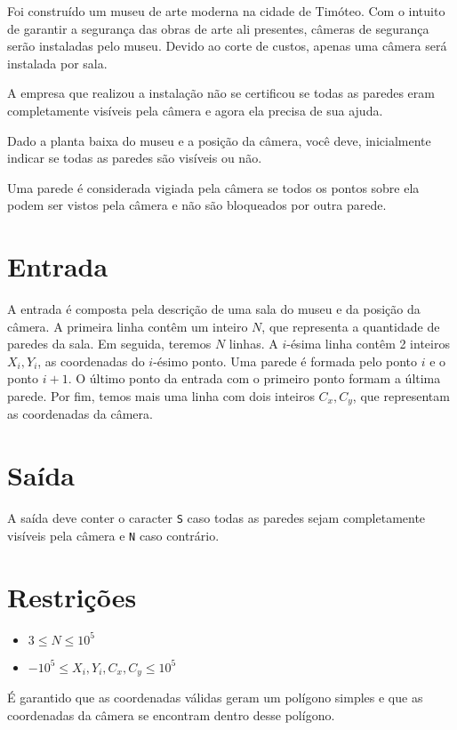 Foi construído um museu de arte moderna na cidade de Timóteo.
Com o intuito de garantir a segurança das obras de arte ali presentes, câmeras de segurança serão instaladas pelo museu.
Devido ao corte de custos, apenas uma câmera será instalada por sala.

A empresa que realizou a instalação não se certificou se todas as paredes eram completamente visíveis pela câmera e agora ela precisa de sua ajuda.

Dado a planta baixa do museu e a posição da câmera, você deve, inicialmente indicar se todas as paredes são visíveis ou não.

Uma parede é considerada vigiada pela câmera se todos os pontos sobre ela podem ser vistos pela câmera e não são bloqueados por outra parede.


\section*{Entrada}

A entrada é composta pela descrição de uma sala do museu e da posição da câmera.
A primeira linha contêm um inteiro $N$, que representa a quantidade de paredes da sala.
Em seguida, teremos $N$ linhas. A $i$-ésima linha contêm 2 inteiros $X_i, Y_i$, as coordenadas do $i$-ésimo ponto.
Uma parede é formada pelo ponto $i$ e o ponto $i+1$. O último ponto da entrada com o primeiro ponto formam a última parede.
Por fim, temos mais uma linha com dois inteiros $C_x, C_y$, que representam as coordenadas da câmera.

\section*{Saída}

A saída deve conter o caracter \texttt{S} caso todas as paredes sejam completamente visíveis pela câmera e \texttt{N} caso contrário.

\section*{Restrições}

\begin{itemize}
    \item $3 \leq N \leq 10^5 $
    \item $-10^5 \leq X_i, Y_i, C_x, C_y \leq 10^5 $
\end{itemize}

É garantido que as coordenadas válidas geram um polígono simples e que as coordenadas da câmera se encontram dentro desse polígono.

